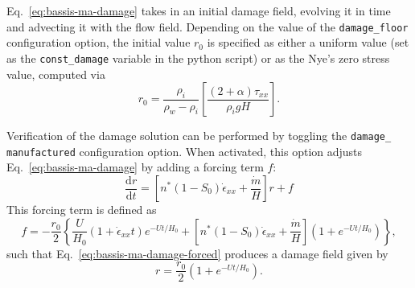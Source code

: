 \documentclass{article}
\begin{document}
Eq.~\ref{eq:bassis-ma-damage} takes in an initial damage field, evolving it in time and advecting it with the flow field. Depending on the value of the \texttt{damage\_floor} configuration option, the initial value $r_0$ is specified as either a uniform value (set as the \texttt{const\_damage} variable in the python script) or as the Nye's zero stress value, computed via \citep{Jezek,Nick-et-al,Nye}
\begin{equation}
   r_0 = \frac{\rho_i}{\rho_w-\rho_i} \left[\frac{\left(2+\alpha\right) \tau_{xx}}{\rho_i gH}\right].
   \label{eq:nye-damage}
\end{equation}

Verification of the damage solution can be performed by toggling the \texttt{damage\_} \texttt{manufactured} configuration option. When activated, this option adjusts Eq.~\ref{eq:bassis-ma-damage} by adding a forcing term $f$:
\begin{equation}
   \frac{\mathrm{d}r}{\mathrm{d}t} = \left[n^* \left(1-S_0\right) \dot{\epsilon}_{xx} + \frac{\dot{m}}{H}\right] r + f
   \label{eq:bassis-ma-damage-forced}
\end{equation}
This forcing term is defined as
\begin{equation}
   f = -\frac{r_0}{2} \left\{\frac{U}{H_0} \left(1+\dot{\epsilon}_{xx}t\right) e^{-Ut/H_0} + \left[n^*\left(1-S_0\right)\dot{\epsilon}_{xx}+\frac{\dot{m}}{H}\right] \left(1+e^{-Ut/H_0}\right)\right\},
   \label{eq:damage-forcing}
\end{equation}
such that Eq.~\ref{eq:bassis-ma-damage-forced} produces a damage field given by
\begin{equation}
   r = \frac{r_0}{2} \left(1+e^{-Ut/H_0}\right).
   \label{eq:manufactured-damage}
\end{equation}



\end{document}
